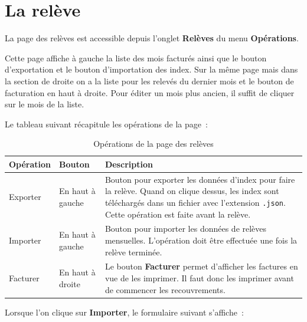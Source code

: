 
\section{La relève}

La page des relèves est accessible depuis l'onglet \textbf{Relèves} du menu \textbf{Opérations}.


Cette page affiche à gauche la liste des mois facturés ainsi que le bouton d'exportation et le bouton d'importation des index. Sur la même page mais dans la section de droite on a la liste pour les relevés du dernier mois et le bouton de facturation en haut à droite. Pour éditer un mois plus ancien, il suffit de cliquer sur le mois de la liste.

Le tableau suivant récapitule les opérations de la page~:

\begin{table}[H]
    \centering
    \small
    \begin{tabular}{@{}p{2.2cm}p{2.2cm}p{8.5cm}@{}}
        \toprule
        \textbf{Opération} & \textbf{Bouton} & \textbf{Description} \\
        \midrule
        Exporter &
        En haut à gauche &
        Bouton pour exporter les données d'index pour faire la relève. Quand on clique dessus, les index sont téléchargés dans un fichier avec l'extension \texttt{.json}. Cette opération est faite avant la relève. \\
        \addlinespace
        Importer &
        En haut à gauche &
        Bouton pour importer les données de relèves mensuelles. L'opération doit être effectuée une fois la relève terminée. \\
        \addlinespace
        Facturer &
        En haut à droite &
        Le bouton \textbf{Facturer} permet d'afficher les factures en vue de les imprimer. Il faut donc les imprimer avant de commencer les recouvrements. \\
        \bottomrule
    \end{tabular}
    \caption{Opérations de la page des relèves}
    \label{tab:operations-releves}
\end{table}

Lorsque l'on clique sur \textbf{Importer}, le formulaire suivant s'affiche~:


